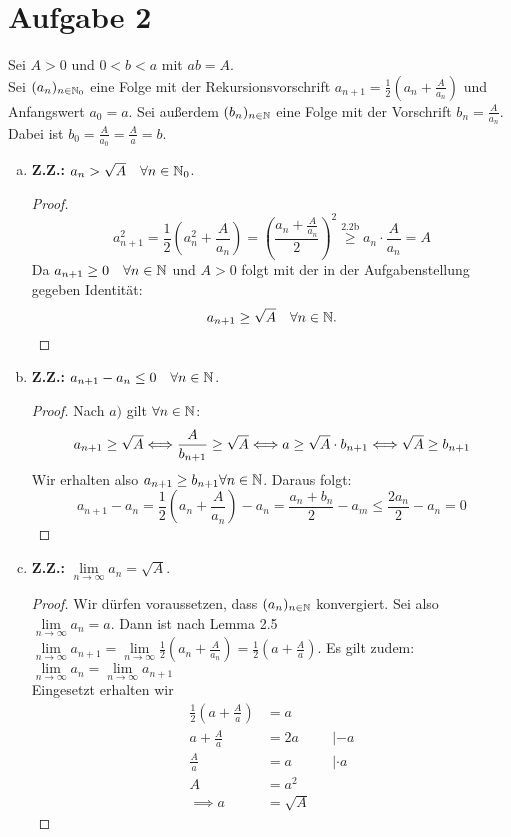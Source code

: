 \documentclass{article}
\begin{document}
\section*{Aufgabe 2}
Sei $A > 0$ und $0 < b < a$ mit $ab = A$.\\
Sei $(a_n)_{n\in \mathbb{N}_0}$ eine Folge mit der Rekursionsvorschrift $a_{n+1} =\frac{1}{2}\left(a_n + \frac{A}{a_n}\right)$ und Anfangswert $a_0 = a$.
Sei außerdem $(b_n)_{n\in \mathbb{N}}$ eine Folge mit der Vorschrift $b_n = \frac{A}{a_n}$. Dabei ist $b_0 = \frac{A}{a_0} = \frac{A}{a}  =b$.
\begin{enumerate}[(a)]
	\item \textbf{Z.Z.:} $a_n > \sqrt{A}\quad \forall n \in \mathbb{N}_0$.
	\begin{proof}
		$$a_{n+1}^2 = \frac{1}{2}\left(a_{n}^2 + \frac{A}{a_{n}}\right) = \left(\frac{a_n + \frac{A}{a_n}}{2}\right)^2 \overset{\text{2.2b}}{\geq} a_n \cdot \frac{A}{a_n} = A$$
		Da $a_{n+1} \geq 0\quad \forall n\in \mathbb{N}$ und $A > 0$ folgt mit der in der Aufgabenstellung gegeben Identität:
		$$ a_{n+1} \geq \sqrt{A} \quad \forall n\in \mathbb{N}.$$
	\end{proof}
	\item \textbf{Z.Z.:} $a_{n+1} - a_n \leq 0\quad  \forall n\in \mathbb{N}$.
	\begin{proof}
		Nach $a)$ gilt $\forall n\in \mathbb{N}$: 
		$$a_{n+1} \geq \sqrt{A}\Longleftrightarrow \frac{A}{b_{n+1}} \geq \sqrt{A} \Longleftrightarrow a \geq \sqrt{A} \cdot b_{n+1} \Longleftrightarrow \sqrt{A} \geq b_{n+1}$$
		Wir erhalten also $a_{n+1} \geq b_{n+1} \forall n\in \mathbb{N}$.
		Daraus folgt: $$a_{n+1} -a_n= \frac{1}{2}\left(a_n + \frac{A}{a_n}\right) -a_n= \frac{a_n + b_n}{2} -a_m \leq \frac{2a_n}{2} - a_n = 0$$
	\end{proof}
	\item \textbf{Z.Z.:} $\lim\limits_{n\to \infty} a_n = \sqrt{A}$.
	\begin{proof}
		Wir dürfen voraussetzen, dass $(a_n)_{n\in \mathbb{N}}$ konvergiert. Sei also $\lim\limits_{n\to \infty} a_n = a$. Dann ist nach Lemma 2.5 $\lim\limits_{n\to \infty} a_{n+1} = \lim\limits_{n\to \infty} \frac{1}{2}\left(a_n + \frac{A}{a_n}\right) = \frac{1}{2}\left(a + \frac{A}{a}\right)$. Es gilt zudem: $\lim\limits_{n\to \infty} a_n = \lim\limits_{n\to \infty} a_{n+1}$\\
		Eingesetzt erhalten wir 
		\begin{align*}
		\frac{1}{2}\left(a + \frac{A}{a}\right) &= a\\
		a + \frac{A}{a} &= 2a&&|-a\\
		\frac{A}{a} &= a&&|\cdot a\\
		A &= a^2\\
		\implies a &= \sqrt{A}
		\end{align*}
	\end{proof}
\end{enumerate}
\end{document}
